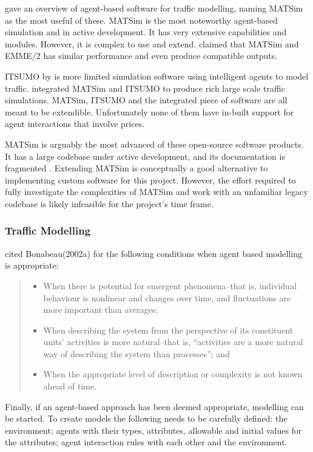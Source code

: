 \textcite{Bernhardt2007taxi+agent} gave an overview of agent-based software for
traffic modelling, naming MATSim as the most useful of these. MATSim is the most
noteworthy agent-based simulation and in active development. It has very
extensive capabilities and modules. However, it is complex to use and extend.
\textcite{Gao2010taxi+comparison} claimed that MATSim and EMME/2 has similar
performance and even produce compatible outputs.

ITSUMO by \textcite{Silva2006itsumo} is more limited simulation software using
intelligent agents to model traffic. \textcite{Bazzan2009integrating}
integrated  MATSim and ITSUMO to produce rich large scale traffic simulations.
MATSim, ITSUMO and the integrated piece of software are all meant to be
extendible. Unfortunately none of them have in-built support for agent
interactions that involve prices.

MATSim is arguably the most advanced of these open-source software products. It
has a large codebase under active development, and its documentation is
fragmented \textcite{Matsim2012}. Extending MATSim is conceptually a good
alternative to implementing custom software for this project. However, the
effort required to fully investigate the complexities of MATSim and work with
an unfamiliar legacy codebase is likely infeasible for the project's time
frame.


\subsubsection{Traffic Modelling}

\textcite[78]{Bernhardt2007taxi+agent} cited Bonabeau(2002a) for the following
conditions when agent based modelling is appropriate:

\begin{quote}
\begin{itemize}
  \item When there is potential for emergent phenomena--that is, individual 
  behaviour is nonlinear and changes over time, and fluctuations are more 
  important than averages;
  \item When describing the system from the perspective of its constituent 
  units’ activities is more natural--that is, “activities are a more natural way
  of describing the system than processes”; and
  \item When the appropriate level of description or complexity is not known 
  ahead of time.
\end{itemize}
\end{quote}

Finally, if an agent-based approach has been deemed appropriate, modelling can
be started. To create models the following needs to be carefully defined: the
environment; agents with their types, attributes, allowable and initial values
for the attributes; agent interaction rules with each other and the
environment. \parencite{Bernhardt2007taxi+agent}
